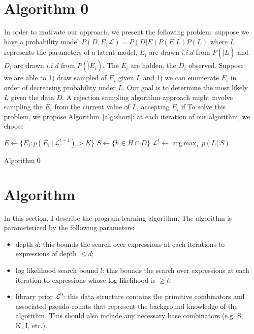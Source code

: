 \documentclass{article}
\DeclareMathOperator*{\argmax}{arg\,max}
\begin{document}
\section{Algorithm 0}
In order to motivate our approach, we present the following problem:
suppose we have a probability model $P(D, E, \mathcal{L}) = P(D|E)
P(E|L) P(L)$ where $L$ represents the parameters of a latent model,
$E_i$ are drawn $i.i.d$ from $P(\dot | L)$ and $D_i$ are drawn $i.i.d$
from $P(\dot|E_i)$. The $E_i$ are hidden, the $D_i$ observed. Suppose
we are able to 1) draw sampled of $E_i$ given $L$ and 1) we can
enumerate $E_i$ in order of decreasing probability under $L$. Our goal
is to determine the most likely $L$ given the data $D$. A rejection
sampling algorithm approach might involve sampling the $E_i$ from the
current value of $L$, accepting $E_i$ if  To solve this problem, we propose
Algorithm~\ref{alg:short}: at each iteration of our algorithm, we
choose

\begin{minipage}{.7\linewidth}
  \begin{algorithm}[H]
    \SetAlgoLined 
    $E \leftarrow \{ E_i : p(E_i\, |\, \mathcal{L}^{t-1}) > K\}$\;
    $S \leftarrow \{ h \in H \cap D \}$\;
    $\mathcal{L}^t \leftarrow \argmax_L p(L \, | \, S)$
    \caption{Algorithm 0}
    \label{alg:short}
  \end{algorithm}
\end{minipage}


\section{Algorithm}
In this section, I describe the program learning algorithm. The
algorithm is parameterized by the following parameters: 

\begin{itemize}
\item depth $d$: this bounds the search over expressions at each
  iterations to expressions of depth $\leq d$;
\item log likelihood search bound $l$: this bounds the search over
  expressions at each iteration to expressions whose log likelihood is
  $\geq l$;
\item library prior $\mathcal{L}^0$: this data structure contains the
  primitive combinators and associated pseudo-counts that represent
  the background knowledge of the algorithm. This should also include
  any necessary base combinators (e.g. S, K, I, etc.).
\end{itemize}
\end{document}
